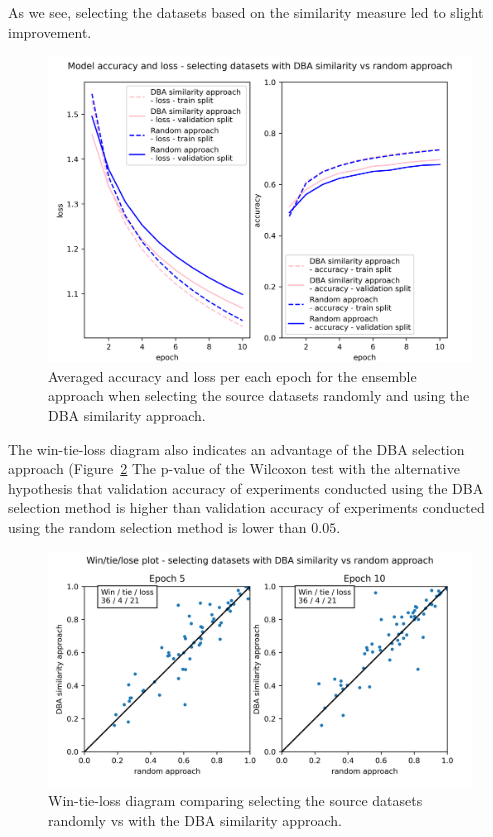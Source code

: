 \documentclass[a4paper,11pt,twoside]{report}
\theoremstyle{definition}
\begin{document}
As we see, selecting the datasets based on the similarity measure led to slight improvement.
\FloatBarrier
\begin{figure}[h!t]
\centering
\includegraphics[width=17cm]{imgs/dba_vs_random/loss_acc.png}
\caption{Averaged accuracy and loss per each epoch for the ensemble approach when selecting the source datasets randomly and using the DBA similarity approach.}
\label{fig:random_vs_dba}
\end{figure}
\FloatBarrier
The win-tie-loss diagram also indicates an advantage of the DBA selection approach (Figure~\ref{fig:random_vs_dba_win_tie_loss}
The p-value of the Wilcoxon test with the alternative hypothesis that validation accuracy of experiments conducted using the DBA selection method is higher than validation accuracy of experiments conducted using the random selection method is lower than $0.05$.
\FloatBarrier
\begin{figure}[h!t]
\centering
\includegraphics[width=17cm]{imgs/dba_vs_random/win_tie_lose_epoch.png}
\caption{Win-tie-loss diagram comparing selecting the source datasets randomly vs with the DBA similarity approach.}
\label{fig:random_vs_dba_win_tie_loss}
\end{figure}
\end{document}
